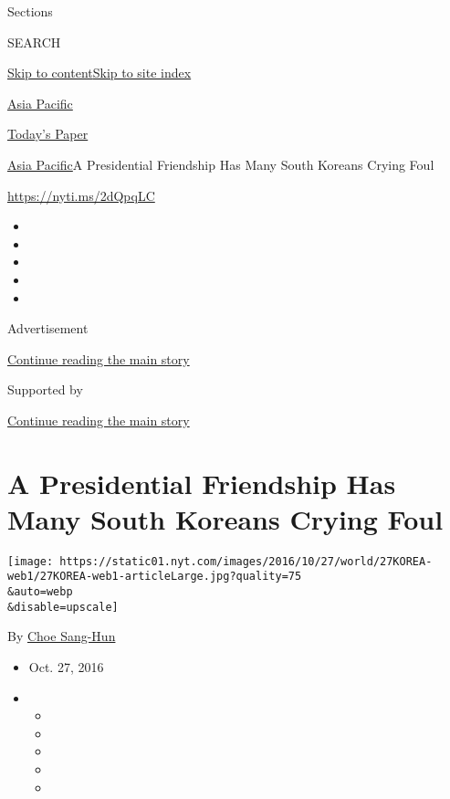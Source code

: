 Sections

SEARCH

\protect\hyperlink{site-content}{Skip to
content}\protect\hyperlink{site-index}{Skip to site index}

\href{https://www.nytimes.com/section/world/asia}{Asia Pacific}

\href{https://myaccount.nytimes.com/auth/login?response_type=cookie\&client_id=vi}{}

\href{https://www.nytimes.com/section/todayspaper}{Today's Paper}

\href{/section/world/asia}{Asia Pacific}\textbar{}A Presidential
Friendship Has Many South Koreans Crying Foul

\url{https://nyti.ms/2dQpqLC}

\begin{itemize}
\item
\item
\item
\item
\item
\end{itemize}

Advertisement

\protect\hyperlink{after-top}{Continue reading the main story}

Supported by

\protect\hyperlink{after-sponsor}{Continue reading the main story}

\hypertarget{a-presidential-friendship-has-many-south-koreans-crying-foul}{%
\section{A Presidential Friendship Has Many South Koreans Crying
Foul}\label{a-presidential-friendship-has-many-south-koreans-crying-foul}}

\texttt{[image: https://static01.nyt.com/images/2016/10/27/world/27KOREA-web1/27KOREA-web1-articleLarge.jpg?quality=75\\\&auto=webp\\\&disable=upscale]}

By \href{http://www.nytimes.com/by/choe-sang-hun}{Choe Sang-Hun}

\begin{itemize}
\item
  Oct. 27, 2016
\item
  \begin{itemize}
  \item
  \item
  \item
  \item
  \item
  \end{itemize}
\end{itemize}

